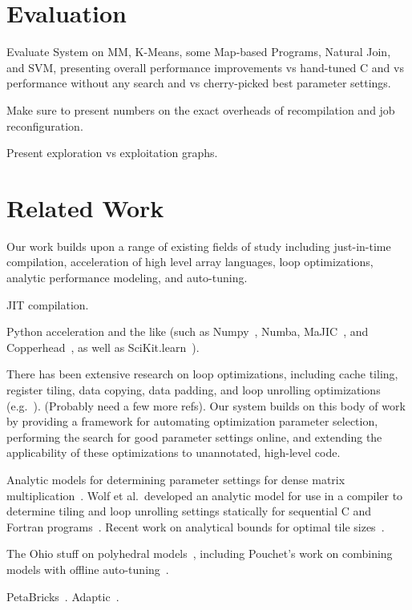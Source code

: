 \documentclass[preprint,9pt]{sigplanconf}
\begin{document}
\section{Evaluation}
\label{evaluation}
Evaluate System on MM, K-Means, some Map-based Programs, Natural Join, and SVM, presenting overall performance improvements vs hand-tuned C and vs performance without any search and vs cherry-picked best parameter settings.

Make sure to present numbers on the exact overheads of recompilation and job reconfiguration.

Present exploration vs exploitation graphs.

\section{Related Work}
\label{related_work}
Our work builds upon a range of existing fields of study including just-in-time compilation, acceleration of high level array languages, loop optimizations, analytic performance modeling, and auto-tuning.

JIT compilation.

Python acceleration and the like (such as Numpy~\cite{Dubo96}, Numba, MaJIC~\cite{Alma02}, and Copperhead~\cite{Cata11}, as well as SciKit.learn~\cite{Pedr11}).

There has been extensive research on loop optimizations, including cache tiling, register tiling, data copying, data padding, and loop unrolling optimizations (e.g.~\cite{Lam91, Wolf91}). (Probably need a few more refs).  Our system builds on this body of work by providing a framework for automating optimization parameter selection, performing the search for good parameter settings online, and extending the applicability of these optimizations to unannotated, high-level code.

Analytic models for determining parameter settings for dense matrix multiplication~\cite{Cole95, Yoto03, Yoto05}.  Wolf et al.~developed an analytic model for use in a compiler to determine tiling and loop unrolling settings statically for sequential C and Fortran programs~\cite{Wolf96}.  Recent work on analytical bounds for optimal tile sizes~\cite{Shir12}.

The Ohio stuff on polyhedral models~\cite{Bond08}, including Pouchet's work on combining models with offline auto-tuning~\cite{Pouc10}.

PetaBricks~\cite{Anse09}.  Adaptic~\cite{Sama12}.
\end{document}
